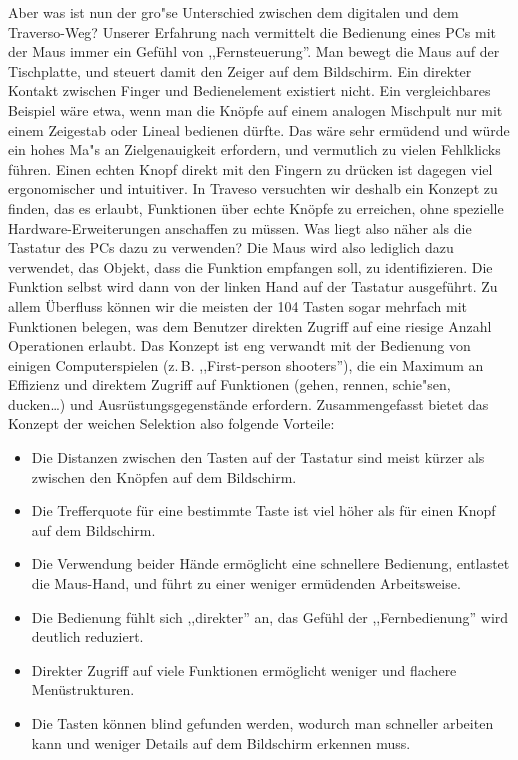 Aber was ist nun der gro"se Unterschied zwischen dem digitalen und dem Traverso-Weg? Unserer Erfahrung nach vermittelt die Bedienung eines PCs mit der Maus immer ein Gefühl von ,,Fernsteuerung''. Man bewegt die Maus auf der Tischplatte, und steuert damit den Zeiger auf dem Bildschirm. Ein direkter Kontakt zwischen Finger und Bedienelement existiert nicht. Ein vergleichbares Beispiel wäre etwa, wenn man die Knöpfe auf einem analogen Mischpult nur mit einem Zeigestab oder Lineal bedienen dürfte. Das wäre sehr ermüdend und würde ein hohes Ma"s an Zielgenauigkeit erfordern, und vermutlich zu vielen Fehlklicks führen. Einen echten Knopf direkt mit den Fingern zu drücken ist dagegen viel ergonomischer und intuitiver. In Traveso versuchten wir deshalb ein Konzept zu finden, das es erlaubt, Funktionen über echte Knöpfe zu erreichen, ohne spezielle Hardware-Erweiterungen anschaffen zu müssen. Was liegt also näher als die Tastatur des PCs dazu zu verwenden? Die Maus wird also lediglich dazu verwendet, das Objekt, dass die Funktion empfangen soll, zu identifizieren. Die Funktion selbst wird dann von der linken Hand auf der Tastatur ausgeführt. Zu allem Überfluss können wir die meisten der 104 Tasten sogar mehrfach mit Funktionen belegen, was dem Benutzer direkten Zugriff auf eine riesige Anzahl Operationen erlaubt. Das Konzept ist eng verwandt mit der Bedienung von einigen Computerspielen (z.\,B. ,,First-person shooters''), die ein Maximum an Effizienz und direktem Zugriff auf Funktionen (gehen, rennen, schie"sen, ducken\dots) und Ausrüstungsgegenstände erfordern. Zusammengefasst bietet das Konzept der weichen Selektion also folgende Vorteile:

\begin{itemize}
 \item Die Distanzen zwischen den Tasten auf der Tastatur sind meist kürzer als zwischen den Knöpfen auf dem Bildschirm.
 \item Die Trefferquote für eine bestimmte Taste ist viel höher als für einen Knopf auf dem Bildschirm.
 \item Die Verwendung beider Hände ermöglicht eine schnellere Bedienung, entlastet die Maus-Hand, und führt zu einer weniger ermüdenden Arbeitsweise.
 \item Die Bedienung fühlt sich ,,direkter'' an, das Gefühl der ,,Fernbedienung'' wird deutlich reduziert.
 \item Direkter Zugriff auf viele Funktionen ermöglicht weniger und flachere Menüstrukturen.
 \item Die Tasten können blind gefunden werden, wodurch man schneller arbeiten kann und weniger Details auf dem Bildschirm erkennen muss.
\end{itemize}

